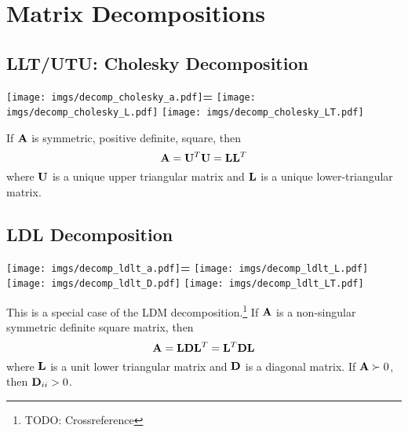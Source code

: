 \chapter{Matrix Decompositions}

\section{LLT/UTU: Cholesky Decomposition} %

\begin{center}
\texttt{[image: imgs/decomp\_cholesky\_a.pdf]}\textbf{\large =}
\texttt{[image: imgs/decomp\_cholesky\_L.pdf]}\textbf{\large *}
\texttt{[image: imgs/decomp\_cholesky\_LT.pdf]}
\end{center}

If $\mathbf{A}$ is symmetric, positive definite, square, then
\begin{equation}
\mathbf{A}=\mathbf{U}^T\mathbf{U}=\mathbf{L}\mathbf{L}^T
\end{equation}
where $\mathbf{U}$ is a unique upper triangular matrix and $\mathbf{L}$ is a unique lower-triangular matrix.

\section{LDL Decomposition}

\begin{center}
\texttt{[image: imgs/decomp\_ldlt\_a.pdf]}\textbf{\large =}
\texttt{[image: imgs/decomp\_ldlt\_L.pdf]}\textbf{\large *}
\texttt{[image: imgs/decomp\_ldlt\_D.pdf]}\textbf{\large *}
\texttt{[image: imgs/decomp\_ldlt\_LT.pdf]}
\end{center}

This is a special case of the LDM decomposition.\footnote{TODO: Crossreference}
If $\mathbf{A}$ is a non-singular symmetric definite square matrix, then
\begin{equation}
\mathbf{A}=\mathbf{L}\mathbf{D}\mathbf{L}^T=\mathbf{L}^T\mathbf{D}\mathbf{L}
\end{equation}
where $\mathbf{L}$ is a unit lower triangular matrix and $\mathbf{D}$ is a diagonal matrix. If $\mathbf{A}\succ0$, then $\mathbf{D}_{ii}>0$.


